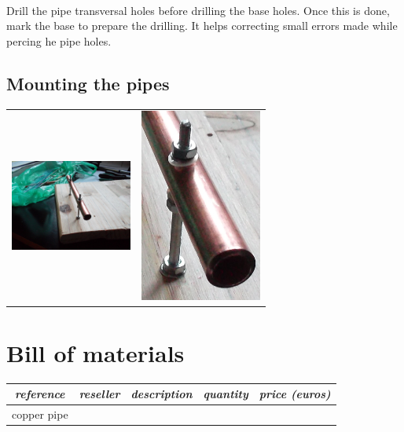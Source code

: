 \documentclass[12pt]{article}
\begin{document}
\paragraph{} Drill the pipe transversal holes before drilling the base holes. Once this is
done, mark the base to prepare the drilling. It helps correcting small errors made while
percing  he pipe holes.

\subsection{Mounting the pipes}
\begin{center}
  \begin{tabular}{c|c}
    \includegraphics[keepaspectratio=true, width=40mm]{../pics/assembly/mounted_pipe_scaled.jpg} &
    \includegraphics[keepaspectratio=true, width=40mm]{../pics/assembly/mounted_pipe_cropped.jpg}
  \end{tabular}
\end{center}

\newpage
\section{Bill of materials}
\begin{center}
  \begin{tabular}{|c|c|c|c|c|}
    \hline
    \textit{reference} &
    \textit{reseller} &
    \textit{description} &
    \textit{quantity} &
    \textit{price (euros)}\\
    \hline
    copper pipe\\
    \hline
  \end{tabular}
\end{center}
\end{document}
